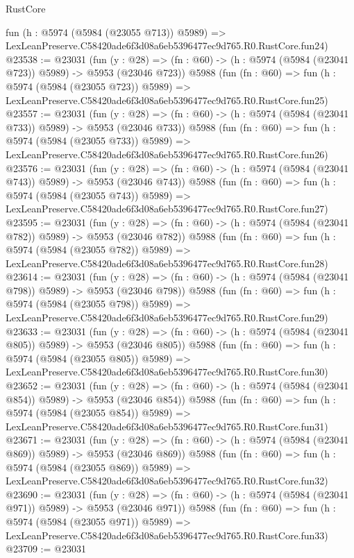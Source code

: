 \begin{lexlean}{RustCore}
\begin{coremodule}
    fun (h : @5974 (@5984 (@23055 @713)) @5989) =>
    LexLeanPreserve.C58420ade6f3d08a6eb5396477ec9d765.R0.RustCore.fun24)
@23538 := @23031
    (fun (y : @28) => (fn : @60) -> (h : @5974 (@5984 (@23041 @723)) @5989) -> @5953 (@23046 @723))
    @5988
    (fun (fn : @60) =>
    fun (h : @5974 (@5984 (@23055 @723)) @5989) =>
    LexLeanPreserve.C58420ade6f3d08a6eb5396477ec9d765.R0.RustCore.fun25)
@23557 := @23031
    (fun (y : @28) => (fn : @60) -> (h : @5974 (@5984 (@23041 @733)) @5989) -> @5953 (@23046 @733))
    @5988
    (fun (fn : @60) =>
    fun (h : @5974 (@5984 (@23055 @733)) @5989) =>
    LexLeanPreserve.C58420ade6f3d08a6eb5396477ec9d765.R0.RustCore.fun26)
@23576 := @23031
    (fun (y : @28) => (fn : @60) -> (h : @5974 (@5984 (@23041 @743)) @5989) -> @5953 (@23046 @743))
    @5988
    (fun (fn : @60) =>
    fun (h : @5974 (@5984 (@23055 @743)) @5989) =>
    LexLeanPreserve.C58420ade6f3d08a6eb5396477ec9d765.R0.RustCore.fun27)
@23595 := @23031
    (fun (y : @28) => (fn : @60) -> (h : @5974 (@5984 (@23041 @782)) @5989) -> @5953 (@23046 @782))
    @5988
    (fun (fn : @60) =>
    fun (h : @5974 (@5984 (@23055 @782)) @5989) =>
    LexLeanPreserve.C58420ade6f3d08a6eb5396477ec9d765.R0.RustCore.fun28)
@23614 := @23031
    (fun (y : @28) => (fn : @60) -> (h : @5974 (@5984 (@23041 @798)) @5989) -> @5953 (@23046 @798))
    @5988
    (fun (fn : @60) =>
    fun (h : @5974 (@5984 (@23055 @798)) @5989) =>
    LexLeanPreserve.C58420ade6f3d08a6eb5396477ec9d765.R0.RustCore.fun29)
@23633 := @23031
    (fun (y : @28) => (fn : @60) -> (h : @5974 (@5984 (@23041 @805)) @5989) -> @5953 (@23046 @805))
    @5988
    (fun (fn : @60) =>
    fun (h : @5974 (@5984 (@23055 @805)) @5989) =>
    LexLeanPreserve.C58420ade6f3d08a6eb5396477ec9d765.R0.RustCore.fun30)
@23652 := @23031
    (fun (y : @28) => (fn : @60) -> (h : @5974 (@5984 (@23041 @854)) @5989) -> @5953 (@23046 @854))
    @5988
    (fun (fn : @60) =>
    fun (h : @5974 (@5984 (@23055 @854)) @5989) =>
    LexLeanPreserve.C58420ade6f3d08a6eb5396477ec9d765.R0.RustCore.fun31)
@23671 := @23031
    (fun (y : @28) => (fn : @60) -> (h : @5974 (@5984 (@23041 @869)) @5989) -> @5953 (@23046 @869))
    @5988
    (fun (fn : @60) =>
    fun (h : @5974 (@5984 (@23055 @869)) @5989) =>
    LexLeanPreserve.C58420ade6f3d08a6eb5396477ec9d765.R0.RustCore.fun32)
@23690 := @23031
    (fun (y : @28) => (fn : @60) -> (h : @5974 (@5984 (@23041 @971)) @5989) -> @5953 (@23046 @971))
    @5988
    (fun (fn : @60) =>
    fun (h : @5974 (@5984 (@23055 @971)) @5989) =>
    LexLeanPreserve.C58420ade6f3d08a6eb5396477ec9d765.R0.RustCore.fun33)
@23709 := @23031

\end{coremodule}
\end{lexlean}

